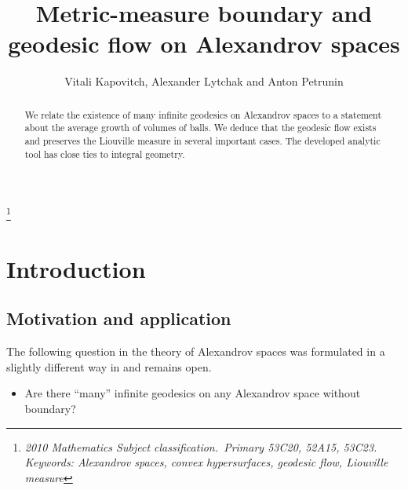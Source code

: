 \documentclass[12pt,leqno,intlimits]{amsart}
\numberwithin{equation}{section}
\theoremstyle{definition}
\theoremstyle{remark}
\begin{document}
\pagebreak
%


\title{Metric-measure boundary and geodesic flow on Alexandrov spaces}
\thanks{\it 2010 Mathematics Subject classification.\rm\ Primary
53C20, 52A15, 53C23. Keywords: Alexandrov spaces, convex hypersurfaces, geodesic flow, Liouville measure}\

\author{Vitali Kapovitch, Alexander Lytchak and Anton Petrunin}





\begin{abstract}
We relate the existence of many infinite geodesics on Alexandrov spaces to a statement about the average growth of volumes of balls. We deduce that the geodesic flow exists and preserves the Liouville measure in several important cases. The developed analytic tool has close ties to integral geometry.
\end{abstract}

\maketitle
\renewcommand{\theequation}{\arabic{section}.\arabic{equation}}


\section{Introduction}
\subsection{Motivation and application}
The following question in the theory of Alexandrov spaces was formulated in a slightly different way in \cite{PP} and remains open.
\begin{itemize}
\item Are there ``many'' infinite geodesics on any Alexandrov space without boundary?
\end{itemize}
\end{document}
